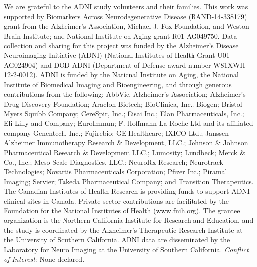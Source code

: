 \documentclass[oupdraft]{bio}
\begin{document}
We are grateful to the ADNI study volunteers and their families. This work was supported by Biomarkers Across Neurodegenerative Disease (BAND-14-338179) grant from the Alzheimer's Association, Michael J. Fox Foundation, and Weston Brain Institute; and National Institute on Aging grant R01-AG049750. Data collection and sharing for this project was funded by the Alzheimer's Disease Neuroimaging Initiative (ADNI) (National Institutes of Health Grant U01 AG024904) and DOD ADNI (Department of Defense award number W81XWH-12-2-0012). ADNI is funded by the National Institute on Aging, the National Institute of Biomedical Imaging and Bioengineering, and through generous contributions from the following: AbbVie, Alzheimer's Association; Alzheimer's Drug Discovery Foundation; Araclon Biotech; BioClinica, Inc.; Biogen; Bristol-Myers Squibb Company; CereSpir, Inc.; Eisai Inc.; Elan Pharmaceuticals, Inc.; Eli Lilly and Company; EuroImmun; F. Hoffmann-La Roche Ltd and its affiliated company Genentech, Inc.; Fujirebio; GE Healthcare; IXICO Ltd.; Janssen Alzheimer Immunotherapy Research \& Development, LLC.; Johnson \& Johnson Pharmaceutical Research \& Development LLC.; Lumosity; Lundbeck; Merck \& Co., Inc.; Meso Scale Diagnostics, LLC.; NeuroRx Research; Neurotrack Technologies; Novartis Pharmaceuticals Corporation; Pfizer Inc.; Piramal Imaging; Servier; Takeda Pharmaceutical Company; and Transition Therapeutics. The Canadian Institutes of Health Research is providing funds to support ADNI clinical sites in Canada. Private sector contributions are facilitated by the Foundation for the National Institutes of Health (www.fnih.org). The grantee organization is the Northern California Institute for Research and Education, and the study is coordinated by the Alzheimer's Therapeutic Research Institute at the University of Southern California. ADNI data are disseminated by the Laboratory for Neuro Imaging at the University of Southern California.
{\it Conflict of Interest}: None declared.





	
	
\end{document}
